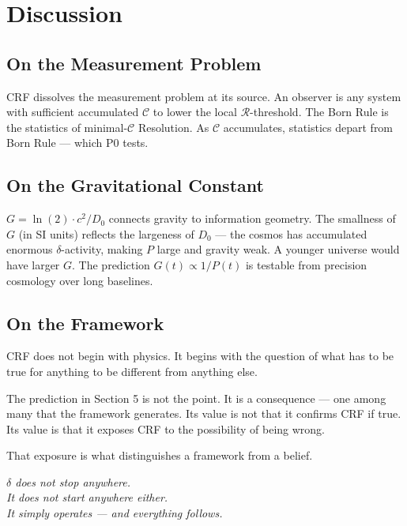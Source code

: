 \documentclass[12pt]{article}
\begin{document}
\section{Discussion}

\subsection{On the Measurement Problem}

CRF dissolves the measurement problem at its source. An observer is
any system with sufficient accumulated $\mathcal{C}$ to lower the
local $\mathcal{R}$-threshold. The Born Rule is the statistics of
minimal-$\mathcal{C}$ Resolution. As $\mathcal{C}$ accumulates,
statistics depart from Born Rule --- which P0 tests.

\subsection{On the Gravitational Constant}

$G = \ln(2)\cdot c^2/D_0$ connects gravity to information geometry.
The smallness of $G$ (in SI units) reflects the largeness of $D_0$
--- the cosmos has accumulated enormous $\delta$-activity,
making $P$ large and gravity weak. A younger universe would have
larger $G$. The prediction $G(t) \propto 1/P(t)$ is testable
from precision cosmology over long baselines.

\subsection{On the Framework}

CRF does not begin with physics. It begins with the question of
what has to be true for anything to be different from anything else.

The prediction in Section 5 is not the point. It is a consequence
--- one among many that the framework generates. Its value is not
that it confirms CRF if true. Its value is that it exposes CRF to
the possibility of being wrong.

That exposure is what distinguishes a framework from a belief.

\bigskip
\begin{center}
\itshape
$\delta$ does not stop anywhere.\\
It does not start anywhere either.\\
It simply operates --- and everything follows.
\end{center}
\end{document}
